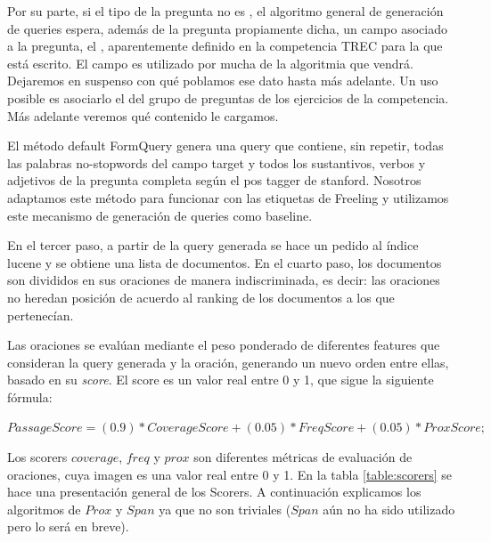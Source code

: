 Por su parte, si el tipo de la pregunta no es , el algoritmo general de generación de queries espera, además de la pregunta propiamente dicha, un campo asociado a la pregunta, el , aparentemente definido en la competencia TREC para la que está escrito. El campo  es utilizado por mucha de la algoritmia que vendrá. Dejaremos en suspenso con qué poblamos ese dato hasta más adelante. Un uso posible es asociarlo el  del grupo de preguntas de los ejercicios de la competencia. Más adelante veremos qué contenido le cargamos.


El método default FormQuery genera una query que contiene, sin repetir, todas las palabras no-stopwords del campo target y todos los sustantivos, verbos y adjetivos de la pregunta completa según el pos tagger de stanford. Nosotros adaptamos este método para funcionar con las etiquetas de Freeling y utilizamos este mecanismo de generación de queries como baseline.

En el tercer paso, a partir de la query generada se hace un pedido al índice lucene y se obtiene una lista de documentos. En el cuarto paso, los documentos son divididos en sus oraciones de manera indiscriminada, es decir: las oraciones no heredan posición de acuerdo al ranking de los documentos a los que pertenecían.

Las oraciones se evalúan mediante el peso ponderado de diferentes features que consideran la query generada y la oración, generando un nuevo orden entre ellas, basado en su \textit{score}. El score es un valor real entre 0 y 1, que sigue la siguiente fórmula:

\medskip

$PassageScore = (0.9)*CoverageScore + (0.05)*FreqScore+ (0.05)*ProxScore;$

\medskip
Los scorers $coverage$, $freq$ y $prox$ son diferentes métricas de evaluación de oraciones, cuya imagen es una valor real entre 0 y 1. En la tabla \ref{table:scorers} se hace una presentación general de los Scorers. A continuación explicamos los algoritmos de $Prox$ y $Span$ ya que no son triviales ($Span$ aún no ha sido utilizado pero lo será en breve).

